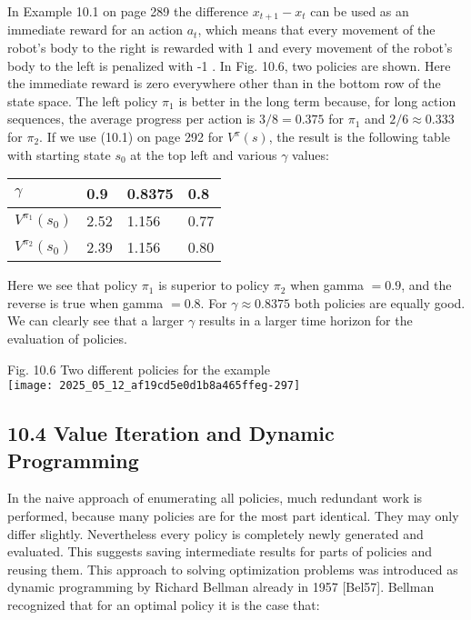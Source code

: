 \documentclass[10pt]{article}
\begin{document}
In Example 10.1 on page 289 the difference $x_{t+1}-x_{t}$ can be used as an immediate reward for an action $a_{t}$, which means that every movement of the robot's body to the right is rewarded with 1 and every movement of the robot's body to the left is penalized with -1 . In Fig. 10.6, two policies are shown. Here the immediate reward is zero everywhere other than in the bottom row of the state space. The left policy $\pi_{1}$ is better in the long term because, for long action sequences, the average progress per action is $3 / 8=0.375$ for $\pi_{1}$ and $2 / 6 \approx 0.333$ for $\pi_{2}$. If we use (10.1) on page 292 for $V^{\pi}(s)$, the result is the following table with starting state $s_{0}$ at the top left and various $\gamma$ values:

\begin{center}
\begin{tabular}{llll}
$\gamma$ & 0.9 & 0.8375 & 0.8 \\
\hline
$V^{\pi_{1}}\left(s_{0}\right)$ & 2.52 & 1.156 & 0.77 \\
\hline
$V^{\pi_{2}}\left(s_{0}\right)$ & 2.39 & 1.156 & 0.80 \\
\hline
\end{tabular}
\end{center}

Here we see that policy $\pi_{1}$ is superior to policy $\pi_{2}$ when gamma $=0.9$, and the reverse is true when gamma $=0.8$. For $\gamma \approx 0.8375$ both policies are equally good. We can clearly see that a larger $\gamma$ results in a larger time horizon for the evaluation of policies.

Fig. 10.6 Two different policies for the example\\
\texttt{[image: 2025\_05\_12\_af19cd5e0d1b8a465ffeg-297]}

\subsection*{10.4 Value Iteration and Dynamic Programming}
In the naive approach of enumerating all policies, much redundant work is performed, because many policies are for the most part identical. They may only differ slightly. Nevertheless every policy is completely newly generated and evaluated. This suggests saving intermediate results for parts of policies and reusing them. This approach to solving optimization problems was introduced as dynamic programming by Richard Bellman already in 1957 [Bel57]. Bellman recognized that for an optimal policy it is the case that:
\end{document}
